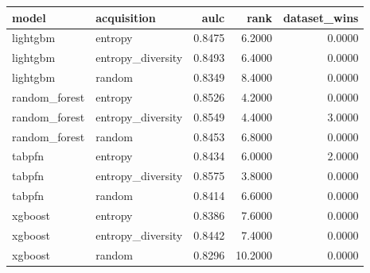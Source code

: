 \begin{tabular}{llrrr}
\toprule
model & acquisition & aulc & rank & dataset_wins \\
\midrule
lightgbm & entropy & 0.8475 & 6.2000 & 0.0000 \\
lightgbm & entropy_diversity & 0.8493 & 6.4000 & 0.0000 \\
lightgbm & random & 0.8349 & 8.4000 & 0.0000 \\
random_forest & entropy & 0.8526 & 4.2000 & 0.0000 \\
random_forest & entropy_diversity & 0.8549 & 4.4000 & 3.0000 \\
random_forest & random & 0.8453 & 6.8000 & 0.0000 \\
tabpfn & entropy & 0.8434 & 6.0000 & 2.0000 \\
tabpfn & entropy_diversity & 0.8575 & 3.8000 & 0.0000 \\
tabpfn & random & 0.8414 & 6.6000 & 0.0000 \\
xgboost & entropy & 0.8386 & 7.6000 & 0.0000 \\
xgboost & entropy_diversity & 0.8442 & 7.4000 & 0.0000 \\
xgboost & random & 0.8296 & 10.2000 & 0.0000 \\
\bottomrule
\end{tabular}
